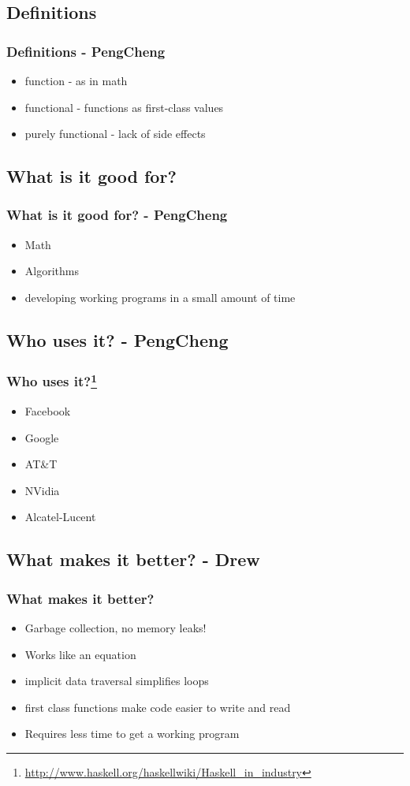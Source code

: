 \documentclass[xcolor=pdftex,dvipsnames,table]{beamer}
\begin{document}
\subsection{Definitions}
\begin{frame}
  \frametitle{Definitions - PengCheng}
  \begin{itemize}
  \item function - as in math
  \item functional - functions as first-class values
  \item purely functional - lack of side effects
  \end{itemize}
\end{frame}

\subsection{What is it good for?}
\begin{frame}
  \frametitle{What is it good for?  - PengCheng}
  \begin{itemize}
  \item Math
  \item Algorithms
  \item developing working programs in a small amount of time
  \end{itemize}
\end{frame}

\subsection{Who uses it? - PengCheng}
\begin{frame}
  \frametitle{Who uses it?\footnote{\url{http://www.haskell.org/haskellwiki/Haskell_in_industry}}}
  \begin{itemize}
  \item Facebook
  \item Google
  \item AT\&T
  \item NVidia
  \item Alcatel-Lucent
  \end{itemize}
\end{frame}

\subsection{What makes it better? - Drew}
\begin{frame}
  \frametitle{What makes it better?}
  \begin{itemize}
  \item Garbage collection, no memory leaks!
  \item Works like an equation
  \item implicit data traversal simplifies loops
  \item first class functions make code easier to write and read
  \item Requires less time to get a working program
  \end{itemize}
\end{frame}
\end{document}
